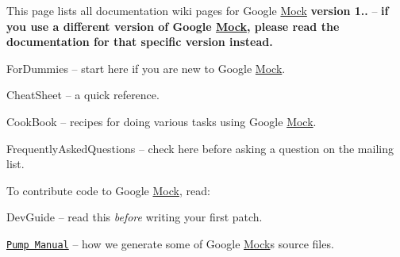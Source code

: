 This page lists all documentation wiki pages for Google \hyperlink{classMock}{Mock} {\bfseries version 1..} -- {\bfseries if you use a different version of Google \hyperlink{classMock}{Mock}, please read the documentation for that specific version instead.}


\begin{DoxyItemize}
\item For\+Dummies -- start here if you are new to Google \hyperlink{classMock}{Mock}.
\item Cheat\+Sheet -- a quick reference.
\item Cook\+Book -- recipes for doing various tasks using Google \hyperlink{classMock}{Mock}.
\item Frequently\+Asked\+Questions -- check here before asking a question on the mailing list.
\end{DoxyItemize}

To contribute code to Google \hyperlink{classMock}{Mock}, read\+:


\begin{DoxyItemize}
\item Dev\+Guide -- read this {\itshape before} writing your first patch.
\item \href{http://code.google.com/p/googletest/wiki/PumpManual}{\tt Pump Manual} -- how we generate some of Google \hyperlink{classMock}{Mock}\textquotesingle{}s source files. 
\end{DoxyItemize}